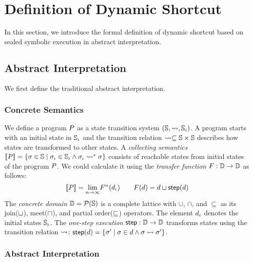 \section{Definition of Dynamic Shortcut}\label{sec:def}

In this section, we introduce the formal definition of dynamic shortcut based on
sealed symbolic execution in abstract interpretation.



\subsection{Abstract Interpretation}

We first define the traditional abstract interpretation.


\subsubsection{Concrete Semantics}

We define a program $P$ as a state transition system $(\mathbb{S}, \leadsto,
\mathbb{S}_\iota)$.  A program starts with an initial state in $\mathbb{S}_\iota$ and the
transition relation $\leadsto \subseteq \mathbb{S} \times \mathbb{S}$ describes how states
are transformed to other states.  A \textit{collecting semantics} $[\![{P}]\!] =
\{ \sigma \in \mathbb{S} \mid \sigma_\iota \in \mathbb{S}_\iota \wedge \sigma_\iota \leadsto^* \sigma \}$ consists of
reachable states from initial states of the program $P$.  We could calculate
it using the \textit{transfer function} $F: \mathbb{D} \rightarrow \mathbb{D}$ as
follows:
\[
  [\![{P}]\!] = \underset{n \rightarrow \infty}{\lim}{F^n(d_\iota)}\\
  \qquad
  F(d) = d \sqcup \textsf{step}(d)\\
\]
The \textit{concrete domain} $\mathbb{D} = \mathcal{P}(\mathbb{S})$ is a complete lattice
with $\cup$, $\cap$, and $\subseteq$ as its join($\sqcup$), meet($\sqcap$), and
partial order($\sqsubseteq$) operators.  The element $d_\iota$ denotes the initial
states $\mathbb{S}_\iota$.  The \textit{one-step execution} $\textsf{step}: \mathbb{D} \rightarrow
\mathbb{D}$ transforms states using the transition relation $\leadsto$: $\textsf{step}(d) =
\{ \sigma' \mid \sigma \in d \wedge \sigma \leadsto \sigma' \}$.


\subsubsection{Abstract Interpretation}


